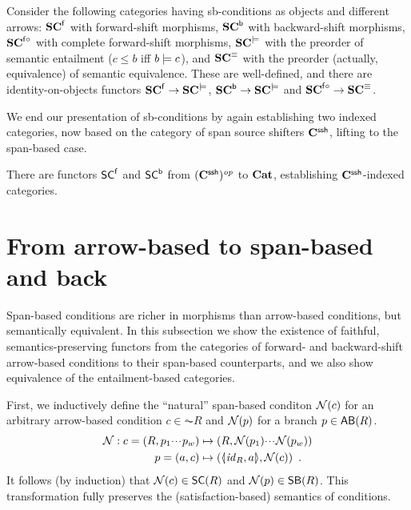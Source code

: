 \begin{theorem}
Consider the following categories having sb-conditions as objects and different arrows: 
$\mathbf{SC}^{\mathsf{f}}$ with forward-shift morphisms, $\mathbf{SC}^{{\mathsf{b}}}$ with backward-shift morphisms, $\mathbf{SC}^{{\mathsf{f}}{\circ}}$ with complete forward-shift morphisms, $\mathbf{SC}^{\models}$ with the preorder of semantic entailment ($c \leq b$ iff $b\models c$), and $\mathbf{SC}^\equiv$ with the preorder (actually, equivalence) of semantic equivalence. These are well-defined, and there are identity-on-objects functors $\mathbf{SC}^{\mathsf{f}} \rightarrow \mathbf{SC}^{\models}$, $\mathbf{SC}^{\mathsf{b}} \rightarrow \mathbf{SC}^{\models}$ and $\mathbf{SC}^{{\mathsf{f}}{\circ}} \rightarrow \mathbf{SC}^{\equiv}$.
\end{theorem}
%
We end our presentation of sb-conditions by again establishing two indexed categories, now based on the category of span source shifters $\mathbf{C}^{\mathsf{ssh}}$, lifting  to the span-based case.

\begin{proposition}
There are functors $\mathsf{SC}^{\mathsf{f}}$ and $\mathsf{SC}^{\mathsf{b}}$ from $(\mathbf{C}^{\mathsf{ssh}})^{\mathit{op}}$ to $\mathbf{Cat}$, establishing $\mathbf{C}^{\mathsf{ssh}}$-indexed categories.
\end{proposition}

\section{From arrow-based to span-based and back}

Span-based conditions are richer in morphisms than arrow-based conditions, but semantically equivalent. In this subsection we show the existence of faithful, semantics-preserving functors from the categories of forward- and backward-shift arrow-based conditions to their span-based counterparts, and we also show equivalence of the entailment-based categories.

First, we inductively define the ``natural'' span-based conditon $\mathcal{N}(c)$ for an arbitrary arrow-based condition $c\in \AC R$ and $\mathcal{N}(p)$ for a branch $p\in \AB R$.
\begin{align*}
\cN: c = (R,p_1\ccdots p_w) & \mapsto (R,\cN(p_1)\ccdots \cN(p_w)) \\
      p=(a,c) & \mapsto (\spanof{\id_R}{a},\cN(c)) \enspace.
\end{align*}
%
It follows (by induction) that $\cN(c)\in \SC R$ and $\cN(p)\in \SB R$. This transformation fully preserves the (satisfaction-based) semantics of conditions.

